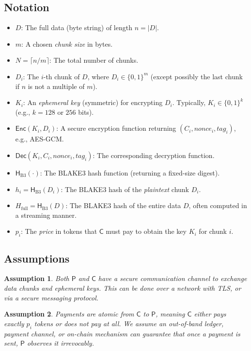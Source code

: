 \documentclass[11pt]{article}
\newtheorem{assumption}{Assumption}
\begin{document}
\subsection{Notation}
\begin{itemize}
    \item $D$: The full data (byte string) of length $n = |D|$.
    \item $m$: A chosen \emph{chunk size} in bytes.
    \item $N = \lceil n / m \rceil$: The total number of chunks.
    \item $D_i$: The $i$-th chunk of $D$, where $D_i \in \{0,1\}^m$ (except possibly the last chunk if $n$ is not a multiple of $m$).
    \item $K_i$: An \emph{ephemeral key} (symmetric) for encrypting $D_i$. Typically, $K_i \in \{0,1\}^{k}$ (e.g., $k=128$ or $256$ bits).
    \item $\mathsf{Enc}(K_i, D_i)$: A secure encryption function returning $(C_i, \mathit{nonce}_i, \mathit{tag}_i)$, e.g., AES-GCM.
    \item $\mathsf{Dec}(K_i, C_i, \mathit{nonce}_i, \mathit{tag}_i)$: The corresponding decryption function.
    \item $\mathsf{H}_{\mathrm{B3}}(\cdot)$: The BLAKE3 hash function (returning a fixed-size digest).
    \item $h_i = \mathsf{H}_{\mathrm{B3}}(D_i)$: The BLAKE3 hash of the \emph{plaintext} chunk $D_i$.
    \item $H_{\mathrm{full}} = \mathsf{H}_{\mathrm{B3}}(D)$: The BLAKE3 hash of the entire data $D$, often computed in a streaming manner.
    \item $p_i$: The \emph{price} in tokens that $\mathsf{C}$ must pay to obtain the key $K_i$ for chunk $i$.
\end{itemize}

\subsection{Assumptions}
\begin{assumption}
Both $\mathsf{P}$ and $\mathsf{C}$ have a secure communication channel to exchange data chunks and ephemeral keys. 
This can be done over a network with TLS, or via a secure messaging protocol.
\end{assumption}

\begin{assumption}
Payments are \emph{atomic} from $\mathsf{C}$ to $\mathsf{P}$, meaning $\mathsf{C}$ either pays exactly $p_i$ tokens or does not pay at all. 
We assume an out-of-band ledger, payment channel, or on-chain mechanism can guarantee that once a payment is sent, $\mathsf{P}$ observes it irrevocably.
\end{assumption}
\end{document}
